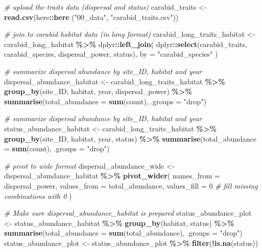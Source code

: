 \documentclass[
]{article}
\newenvironment{Shaded}{\begin{snugshade}}{\end{snugshade}}
\newcommand{\AttributeTok}[1]{\textcolor[rgb]{0.13,0.29,0.53}{#1}}
\newcommand{\CommentTok}[1]{\textcolor[rgb]{0.56,0.35,0.01}{\textit{#1}}}
\newcommand{\DecValTok}[1]{\textcolor[rgb]{0.00,0.00,0.81}{#1}}
\newcommand{\FunctionTok}[1]{\textcolor[rgb]{0.13,0.29,0.53}{\textbf{#1}}}
\newcommand{\NormalTok}[1]{#1}
\newcommand{\OtherTok}[1]{\textcolor[rgb]{0.56,0.35,0.01}{#1}}
\newcommand{\SpecialCharTok}[1]{\textcolor[rgb]{0.81,0.36,0.00}{\textbf{#1}}}
\newcommand{\StringTok}[1]{\textcolor[rgb]{0.31,0.60,0.02}{#1}}
\begin{document}
\begin{Shaded}
\begin{Highlighting}[]
\CommentTok{\# upload the traits data (dispersal and status)}
\NormalTok{carabid\_traits }\OtherTok{\textless{}{-}} \FunctionTok{read.csv}\NormalTok{(here}\SpecialCharTok{::}\FunctionTok{here}\NormalTok{ (}\StringTok{"00\_data"}\NormalTok{, }\StringTok{"carabid\_traits.csv"}\NormalTok{))}


\CommentTok{\# join to carabid habitat data (in long format)}
\NormalTok{carabid\_long\_traits\_habitat }\OtherTok{\textless{}{-}}\NormalTok{ carabid\_long\_habitat }\SpecialCharTok{\%\textgreater{}\%}
\NormalTok{  dplyr}\SpecialCharTok{::}\FunctionTok{left\_join}\NormalTok{(}
\NormalTok{    dplyr}\SpecialCharTok{::}\FunctionTok{select}\NormalTok{(carabid\_traits, carabid\_species, dispersal\_power, status),}
    \AttributeTok{by =} \StringTok{"carabid\_species"}
\NormalTok{  )}


\CommentTok{\# summarize dispersal abundance by site\_ID, habitat and year}
\NormalTok{dispersal\_abundance\_habitat }\OtherTok{\textless{}{-}}\NormalTok{ carabid\_long\_traits\_habitat }\SpecialCharTok{\%\textgreater{}\%}
  \FunctionTok{group\_by}\NormalTok{(site\_ID, habitat, year, dispersal\_power) }\SpecialCharTok{\%\textgreater{}\%}
  \FunctionTok{summarise}\NormalTok{(}\AttributeTok{total\_abundance =} \FunctionTok{sum}\NormalTok{(count), }\AttributeTok{.groups =} \StringTok{"drop"}\NormalTok{)}

\CommentTok{\# summarize dispersal abundance by site\_ID, habitat and year}
\NormalTok{status\_abundance\_habitat }\OtherTok{\textless{}{-}}\NormalTok{ carabid\_long\_traits\_habitat }\SpecialCharTok{\%\textgreater{}\%}
  \FunctionTok{group\_by}\NormalTok{(site\_ID, habitat, year, status) }\SpecialCharTok{\%\textgreater{}\%}
  \FunctionTok{summarise}\NormalTok{(}\AttributeTok{total\_abundance =} \FunctionTok{sum}\NormalTok{(count), }\AttributeTok{.groups =} \StringTok{"drop"}\NormalTok{)}

\CommentTok{\# pivot to wide format}
\NormalTok{dispersal\_abundance\_wide }\OtherTok{\textless{}{-}}\NormalTok{ dispersal\_abundance\_habitat }\SpecialCharTok{\%\textgreater{}\%}
  \FunctionTok{pivot\_wider}\NormalTok{(}
    \AttributeTok{names\_from =}\NormalTok{ dispersal\_power,}
    \AttributeTok{values\_from =}\NormalTok{ total\_abundance,}
    \AttributeTok{values\_fill =} \DecValTok{0}  \CommentTok{\# fill missing combinations with 0}
\NormalTok{  )}

\CommentTok{\# Make sure dispersal\_abundance\_habitat is prepared}
\NormalTok{status\_abundance\_plot }\OtherTok{\textless{}{-}}\NormalTok{ status\_abundance\_habitat }\SpecialCharTok{\%\textgreater{}\%}
  \FunctionTok{group\_by}\NormalTok{(habitat, status) }\SpecialCharTok{\%\textgreater{}\%}
  \FunctionTok{summarise}\NormalTok{(}\AttributeTok{total\_abundance =} \FunctionTok{sum}\NormalTok{(total\_abundance), }\AttributeTok{.groups =} \StringTok{"drop"}\NormalTok{)}
\NormalTok{status\_abundance\_plot }\OtherTok{\textless{}{-}}\NormalTok{ status\_abundance\_plot }\SpecialCharTok{\%\textgreater{}\%}
  \FunctionTok{filter}\NormalTok{(}\SpecialCharTok{!}\FunctionTok{is.na}\NormalTok{(status))}


\end{Highlighting}
\end{Shaded}
\end{document}
